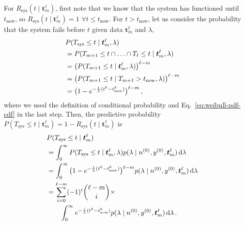 \documentclass[12pt,a4paper,twocolumn,fleqn]{narms}
\newcommand{\dd}{\,\mathrm{d}}
\renewcommand{\vec}[1]{{\bm#1}}
\newcommand{\uz}{^{(0)}} %
\def\yz{y\uz}
\def\nz{n\uz}
\begin{document}
For $R_\text{sys}(t \mid \vec{t}_m^\ell)$, first note that we know that the system has functioned until $t_\text{now}$,
so $R_\text{sys}(t \mid \vec{t}_m^\ell) = 1$ $\forall t \leq t_\text{now}$.
For $t > t_\text{now}$, let us consider the probability
that the system fails before $t$ given data $\vec{t}_m^\ell$ and $\lambda$,
\begin{align}
\lefteqn{P(T_\text{sys} \leq t \mid \vec{t}_m^\ell, \lambda)} \\ 
 &= P(T_{m+1}\leq t \cap \ldots \cap T_\ell \leq t \mid \vec{t}_m^\ell, \lambda) \nonumber \\
 &= \big( P(T_{m+1} \leq t \mid \vec{t}_m^\ell, \lambda) \big)^{\ell-m} \nonumber \\
 &= \big( P(T_{m+1} \leq t \mid T_{m+1} > t_\text{now}, \lambda) \big)^{\ell-m} \nonumber \\
 &= \big( 1 - e^{-\frac{1}{\lambda} (t^k - t_\text{now}^k)} \big)^{\ell-m}\,, \nonumber
\end{align}
where we used the definition of conditional probability
and Eq.~\eqref{eq:weibull-pdf-cdf} in the last step.
%
Then, the predictive probability
$P(T_\text{sys} \leq t \mid \vec{t}_m^\ell) = 1 - R_\text{sys}(t \mid \vec{t}_m^\ell)$ is
\begin{align}
\lefteqn{P(T_\text{sys} \leq t \mid \vec{t}_m^\ell)} \\
 &= \int_0^\infty P(T_\text{sys} \leq t \mid \vec{t}_m^\ell, \lambda)
    p(\lambda \mid \nz, \yz, \vec{t}_m^\ell) \dd\lambda \nonumber \\
 &= \int_0^\infty \big( 1 - e^{-\frac{1}{\lambda} (t^k - t_\text{now}^k)} \big)^{\ell-m}
    p(\lambda \mid \nz, \yz, \vec{t}_m^\ell) \dd\lambda \nonumber \\
 &=\sum_{i=0}^{\ell-m} (-1)^i {\ell-m \choose i} \times \nonumber \\ 
 & \qquad
    \int_0^\infty e^{-\frac{i}{\lambda} (t^k - t_\text{now}^k)}
    p(\lambda \mid \nz, \yz, \vec{t}_m^\ell) \dd\lambda \,. \nonumber
\end{align}
\end{document}
